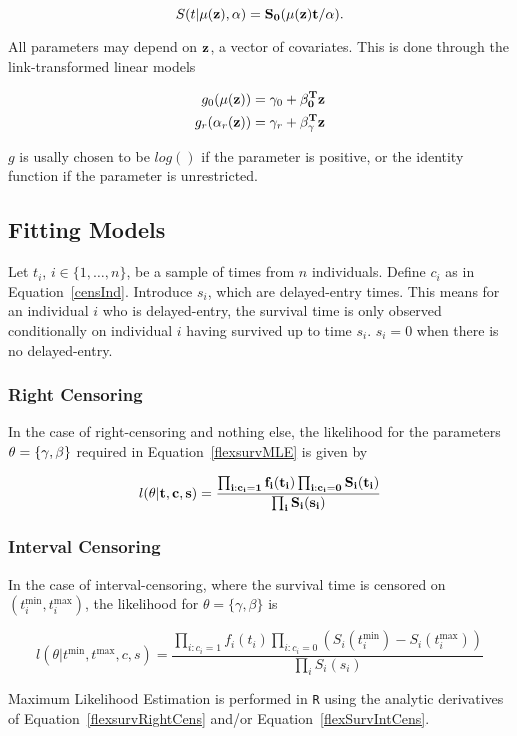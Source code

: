 \[
    S(t|\mu(\bf{z}), \bf{\alpha}) = S_0(\mu(\bf{z})t/\bf{\alpha}).  
\]

All parameters may depend on $\bf{z}$, a vector of covariates. This is done through the link-transformed linear models

\begin{align}
    \label{flexsurvMLE}
    g_0(\mu(\bf{z})) &= \gamma_0 + \bf{\beta}_0^Tz \nonumber \\
    g_r(\alpha_r(\bf{z})) &= \gamma_r + \bf{\beta}_{\gamma}^T\bf{z}
\end{align}

$g$ is usally chosen to be $log()$ if the parameter is positive, or the identity function if the parameter is unrestricted.\\

\subsection{Fitting Models}
Let $t_i$, $i \in \{1, \ldots, n\}$, be a sample of times from $n$ individuals. Define $c_i$ as in Equation~\ref{censInd}. Introduce $s_i$, which are delayed-entry times. This means for an individual $i$ who is delayed-entry, the survival time is only observed conditionally on individual $i$ having survived up to time $s_i$. $s_i = 0$ when there is no delayed-entry. \\

\subsubsection{Right Censoring}
In the case of right-censoring and nothing else, the likelihood for the parameters $\bf{\theta} = \{\bf{\gamma}, \bf{\beta}\}$ required in Equation~\ref{flexsurvMLE} is given by 

\begin{equation}
    \label{flexsurvRightCens}
    l(\bf{\theta}|t,c,s) = \frac{\prod_{i:c_i=1} f_i(t_i) \prod_{i:c_i=0} S_i(t_i)}{\prod_{i} S_i(s_i)}
\end{equation}

\subsubsection{Interval Censoring}
In the case of interval-censoring, where the survival time is censored on $(t_i^{\text{min}}, t_i^{\text{max}})$, the likelihood for $\theta = \{\gamma, \beta\}$ is 

\begin{equation}
    \label{flexSurvIntCens}
    l(\theta|t^\text{min}, t^\text{max}, c,s) = \frac{\prod_{i:c_i=1} f_i(t_i) \prod_{i:c_i=0} \left(S_i(t_i^{\text{min}}) - S_i(t_i^{\text{max}}) \right)}{\prod_{i} S_i(s_i)}
\end{equation}

Maximum Likelihood Estimation is performed in \verb|R| using the analytic derivatives of Equation~\ref{flexsurvRightCens} and/or Equation~\ref{flexSurvIntCens}. 
